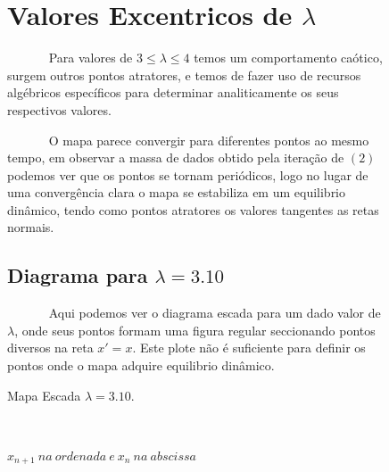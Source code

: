\documentclass[pdftex,12pt,a4paper]{article}
\begin{document}
\begin{figure}

\section{Valores Excentricos de $\lambda$}
~~~~~~ Para valores de $3 \leq \lambda \leq 4$ temos um comportamento caótico, surgem outros pontos atratores, e temos de fazer uso de recursos algébricos específicos para determinar analiticamente os seus respectivos valores.\

~~~~~~ O mapa parece convergir para diferentes pontos ao mesmo tempo, em observar a massa de dados obtido pela iteração de $(2)$ podemos ver que os pontos se tornam periódicos, logo no lugar de uma convergência clara o mapa se estabiliza em um equilibrio dinâmico, tendo como pontos atratores os valores tangentes as retas normais.

\subsection{Diagrama para $\lambda = 3.10$}
~~~~~~ Aqui podemos ver o diagrama escada para um dado valor de $\lambda$, onde seus pontos formam uma figura regular seccionando pontos diversos na reta $x'=x$. Este plote não é suficiente para definir os pontos onde o mapa adquire equilibrio dinâmico.\

\centering
\caption{Mapa Escada $\lambda = 3.10$.}
\caption*{$x_{n+1}\ na\ ordenada\ e\ x_{n}\ na\ abscissa$ }\ 
\end{figure}
\end{document}
